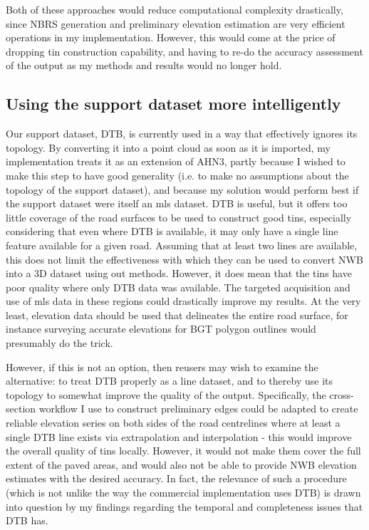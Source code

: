 Both of these approaches would reduce computational complexity drastically, since NBRS generation and preliminary elevation estimation are very efficient operations in my implementation. However, this would come at the price of dropping \ac{tin} construction capability, and having to re-do the accuracy assessment of the output as my methods and results would no longer hold.

\subsection{Using the support dataset more intelligently}
\label{sub:improvementssupportdataset}

Our support dataset, DTB, is currently used in a way that effectively ignores its topology. By converting it into a point cloud as soon as it is imported, my implementation treats it as an extension of AHN3, partly because I wished to make this step to have good generality (i.e. to make no assumptions about the topology of the support dataset), and because my solution would perform best if the support dataset were itself an \ac{mls} dataset. DTB is useful, but it offers too little coverage of the road surfaces to be used to construct good \ac{tin}s, especially considering that even where DTB is available, it may only have a single line feature available for a given road. Assuming that at least two lines are available, this does not limit the effectiveness with which they can be used to convert NWB into a 3D dataset using out methods. However, it does mean that the \ac{tin}s have poor quality where only DTB data was available. The targeted acquisition and use of \ac{mls} data in these regions could drastically improve my results. At the very least, elevation data should be used that delineates the entire road surface, for instance surveying accurate elevations for BGT polygon outlines would presumably do the trick.

However, if this is not an option, then reusers may wish to examine the alternative: to treat DTB properly as a line dataset, and to thereby use its topology to somewhat improve the quality of the output. Specifically, the cross-section workflow I use to construct preliminary edges could be adapted to create reliable elevation series on both sides of the road centrelines where at least a single DTB line exists via extrapolation and interpolation - this would improve the overall quality of \ac{tin}s locally. However, it would not make them cover the full extent of the paved areas, and would also not be able to provide NWB elevation estimates with the desired accuracy. In fact, the relevance of such a procedure (which is not unlike the way the commercial implementation uses DTB) is drawn into question by my findings regarding the temporal and completeness issues that DTB has.